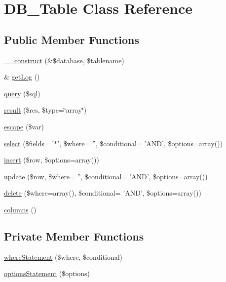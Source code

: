 \hypertarget{classDB__Table}{
\section{DB\_\-Table Class Reference}
\label{d6/d90/classDB__Table}
}
\subsection*{Public Member Functions}
\begin{DoxyCompactItemize}
\item 
\hyperlink{classDB__Table_ae1cbbd01f9100d98db4de61e11ccfab2}{\_\-\_\-construct} (\&\$database, \$tablename)
\item 
\& \hyperlink{classDB__Table_a3c86c1069485a5bdff2e4152b8485443}{getLog} ()
\item 
\hyperlink{classDB__Table_a88064818e52f2002d18849600e077239}{query} (\$sql)
\item 
\hyperlink{classDB__Table_a041e54ac21aac399fb9ba2f6227554b1}{result} (\$res, \$type=\char`\"{}array\char`\"{})
\item 
\hyperlink{classDB__Table_a32f3e1b7ac33c40432f6204cc0af8b66}{escape} (\$var)
\item 
\hyperlink{classDB__Table_a9d3c4b24a4c0d7218dd6b4f376a1aa9b}{select} (\$fields= '$\ast$', \$where= '', \$conditional= 'AND', \$options=array())
\item 
\hyperlink{classDB__Table_a843dcb7cc2f8eac5865d05de68d9c0bf}{insert} (\$row, \$options=array())
\item 
\hyperlink{classDB__Table_a96ba2b025ea8882eb171eff83749d6be}{update} (\$row, \$where= '', \$conditional= 'AND', \$options=array())
\item 
\hyperlink{classDB__Table_a2374e86114f0af3132e4df6d55301628}{delete} (\$where=array(), \$conditional= 'AND', \$options=array())
\item 
\hyperlink{classDB__Table_a480182430c70002f3b780a9d76be91b9}{columns} ()
\end{DoxyCompactItemize}
\subsection*{Private Member Functions}
\begin{DoxyCompactItemize}
\item 
\hyperlink{classDB__Table_aee8ad81369c558bcf29a9b4cf0961b41}{whereStatement} (\$where, \$conditional)
\item 
\hyperlink{classDB__Table_a56bde02ad43e915898c7709e4d2ec75e}{optionsStatement} (\$options)
\end{DoxyCompactItemize}
